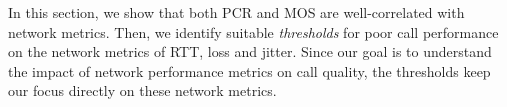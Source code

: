 In this section, we show that both PCR and MOS are 
well-correlated with network metrics. %
Then, we identify suitable {\em thresholds} for poor call 
performance on the network metrics of RTT, loss and jitter. 
Since our goal is to understand the impact of network 
performance metrics on call quality, the thresholds keep 
our focus directly on these network metrics.

